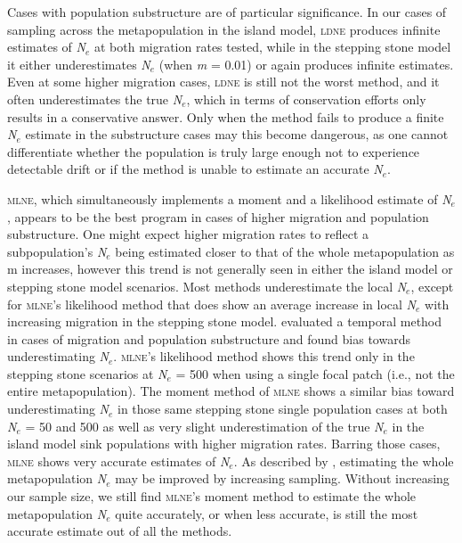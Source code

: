 Cases with population substructure are of particular significance. In our cases of sampling across 
the metapopulation in the island model, \textsc{ldne} produces infinite estimates of \emph{N}$_e$ at 
both migration rates tested, while in the stepping stone model it either underestimates \emph{N}$_e$ 
(when \emph{m} = 0.01) or again produces infinite estimates. Even at some higher migration cases, \textsc{ldne} 
is still not the worst method, and it often underestimates the true \emph{N}$_e$, which in terms of 
conservation efforts only results in a conservative answer. Only when the method fails to produce a 
finite \emph{N}$_e$ estimate in the substructure cases may this become dangerous, as one cannot 
differentiate whether the population is truly large enough not to experience detectable drift or if 
the method is unable to estimate an accurate \emph{N}$_e$.

\textsc{mlne}, which simultaneously implements a moment and a likelihood estimate of \emph{N}$_e$, 
appears to be the best program in cases of higher migration and population substructure. One might 
expect higher migration rates to reflect a subpopulation's \emph{N}$_e$ being estimated closer to 
that of the whole metapopulation as m increases, however this trend is not generally seen in either 
the island model or stepping stone model scenarios. Most methods underestimate the local \emph{N}$_e$, 
except for \textsc{mlne}'s likelihood method that does show an average increase in local \emph{N}$_e$ 
with increasing migration in the stepping stone model. \citet{Ryman:2013} evaluated a temporal method 
in cases of migration and population substructure and found bias towards underestimating \emph{N}$_e$. 
\textsc{mlne}'s likelihood method shows this trend only in the stepping stone scenarios at \emph{N}$_e$ = 500 
when using a single focal patch (i.e., not the entire metapopulation). The moment method of \textsc{mlne} shows 
a similar bias toward underestimating \emph{N}$_e$ in those same stepping stone single population 
cases at both \emph{N}$_e$ = 50 and 500 as well as very slight underestimation of the true \emph{N}$_e$ 
in the island model sink populations with higher migration rates. Barring those cases, \textsc{mlne} shows 
very accurate estimates of \emph{N}$_e$. As described by \citet{Ryman:2013}, estimating the whole 
metapopulation \emph{N}$_e$ may be improved by increasing sampling. Without increasing our sample size, 
we still find \textsc{mlne}'s moment method to estimate the whole metapopulation \emph{N}$_e$ quite 
accurately, or when less accurate, is still the most accurate estimate out of all the methods.

